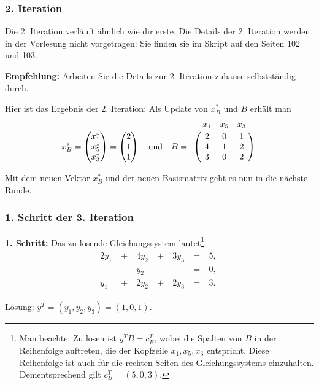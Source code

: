\documentclass[smaller]{beamer}
\begin{document}
\begin{frame}
 \frametitle{2. Iteration}
 Die 2. Iteration verläuft ähnlich wie dir erste. Die Details der 2. Iteration werden in der Vorlesung nicht vorgetragen: Sie finden sie im Skript auf den Seiten 102 und 103. \\ \vspace*{0.2cm}

 \textbf{Empfehlung:} Arbeiten Sie die Details zur 2. Iteration zuhause selbstständig durch. \\ \vspace*{0.2cm} 

\alert{Hier ist das Ergebnis der 2. Iteration:} Als Update von $x_B^*$ und $B$ erhält man
\[
x_B^* = \begin{pmatrix} x_1^* \\ x_5^* \\ x_3^* \end{pmatrix} = \begin{pmatrix} 2 \\ 1 \\ 1 \end{pmatrix} \quad \text{und} \quad
B = \bordermatrix{ & x_1 & x_5 & x_3 \cr & 2 & 0 & 1 \cr & 4 & 1 & 2 \cr & 3 & 0 & 2 }.
\]

Mit dem neuen Vektor $x_B^*$ und der neuen Basismatrix geht es nun in die nächste Runde.
\end{frame}

\begin{frame}
 \frametitle{1. Schritt der 3. Iteration}
 {\textbf{1. Schritt:}} Das zu lösende Gleichungssystem lautet\footnote{Man beachte: Zu lösen ist $y^TB = c_B^T$, wobei die Spalten von $B$ in der Reihenfolge auftreten, die der Kopfzeile $x_1,x_5,x_3$ entspricht. \alert{Diese Reihenfolge ist auch für die rechten Seiten des Gleichungssystems einzuhalten}. Dementsprechend gilt $c_B^T = (5,0,3)$.}
\begin{align*}
\begin{alignedat}{4}
2y_1 &\ + &\ 4y_2 &\ + &\ 3y_3 &\ = &\ 5,\ \\
     &\   &\  y_2 &\   &\      &\ = &\ 0,\ \\
 y_1 &\ + &\ 2y_2 &\ + &\ 2y_3 &\ = &\ 3.\ 
\end{alignedat}
\end{align*}

Lösung: $y^T = (y_1,y_2,y_3) = (1,0,1)$.
\end{frame}
\end{document}
